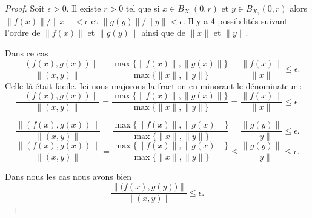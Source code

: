 \begin{proof}
	Soit \( \epsilon>0\). Il existe \( r>0\) tel que si \( x\in B_{X_1}(0,r)\) et \( y\in B_{X_2}(0,r)\) alors \( \| f(x) \|/\| x \|<\epsilon\) et \( \| g(y) \|/\| y \| <\epsilon\). Il y a 4 possibilités suivant l'ordre de \( \| f(x) \|\) et \( \| g(y) \|\) ainsi que de \( \| x \|\) et \( \| y \|\).
	\begin{subproof}
		\spitem[Si \( \| f(x) \|\geq \| g(y) \|\)]
		\begin{subproof}
			\spitem[Si \( \| x \|\geq \| y \|\)]
			Dans ce cas
			\begin{equation}
				\frac{ \| (f(x),g(x)) \| }{ \| (x,y) \| }=\frac{ \max\{ \| f(x) \|,\| g(x) \| \} }{ \max\{ \| x \|,\| y \| \} }=\frac{ \| f(x) \| }{ \| x \| }\leq \epsilon.
			\end{equation}
			Celle-là était facile.
			\spitem[Si \( \| y \|\geq \| x \|\)]
			Ici nous majorons la fraction en minorant le dénominateur :
			\begin{equation}
				\frac{ \| (f(x),g(x)) \| }{ \| (x,y) \| }=\frac{ \max\{ \| f(x) \|,\| g(x) \| \} }{ \max\{ \| x \|,\| y \| \} }=\frac{ \| f(x) \| }{ \| x \| }\leq \epsilon.
			\end{equation}
		\end{subproof}
		\spitem[Si \( \| f(y) \|\geq \| g(y) \|\)]
		\begin{subproof}
			\spitem[Si \( \| x \|\geq \| y \|\)]
			\begin{equation}
				\frac{ \| (f(x),g(x)) \| }{ \| (x,y) \| }=\frac{ \max\{ \| f(x) \|,\| g(x) \| \} }{ \max\{ \| x \|,\| y \| \} }=\frac{ \| g(y) \| }{ \| y \| }\leq \epsilon.
			\end{equation}
			\spitem[Si \( \| y \|\geq \| x \|\)]
			\begin{equation}
				\frac{ \| (f(x),g(x)) \| }{ \| (x,y) \| }=\frac{ \max\{ \| f(x) \|,\| g(x) \| \} }{ \max\{ \| x \|,\| y \| \} }\leq \frac{ \| g(y) \| }{ \| y \| }\leq \epsilon.
			\end{equation}
		\end{subproof}
	\end{subproof}
	Dans nous les cas nous avons bien
	\begin{equation}
		\frac{ \| \big( f(x),g(y) \big) \| }{ \| (x,y) \| }\leq \epsilon.
	\end{equation}
\end{proof}



